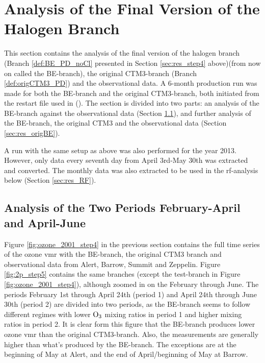 

\clearpage

\section{Analysis of the Final Version of the Halogen Branch}\label{sec:res_final_Version}

This section contains the analysis of the final version of the halogen branch (Branch \ref{def:BE_PD_noCl} presented in Section \ref{sec:res_step4} above)(from now on called the BE-branch), the original CTM3-branch (Branch \ref{def:origCTM3_PD}) and the observational data. A 6-month production run was made for both the BE-branch and the original CTM3-branch, both initiated from the restart file used in  (\cite{Falk_2019}). The section is divided into two parts: an analysis of the BE-branch against the observational data (Section \ref{sec:res_twoPeriods}), and further analysis of the BE-branch, the original CTM3 and the observational data (Section \ref{sec:res_origBE}).

\medskip

A run with the same setup as above was also performed for the year 2013. However, only data every seventh day from April 3rd-May 30th was extracted and converted. The monthly data was also extracted to be used in the \acrlong{rf}-analysis below (Section \ref{sec:res_RF}). 

\subsection{Analysis of the Two Periods February-April and April-June}\label{sec:res_twoPeriods}

Figure \ref{fig:ozone_2001_step4} in the previous section contains the full time series of the ozone \acrshort{vmr} with the BE-branch, the original CTM3 branch and observational data from Alert, Barrow, Summit and Zeppelin. Figure \ref{fig:2p_step5} contains the same branches (except the test-branch in Figure \ref{fig:ozone_2001_step4}), although zoomed in on the February through June. The periods February 1st through April 24th (period 1) and April 24th through June 30th (period 2) are divided into two periods, as the BE-branch seems to follow different regimes with lower $\mathrm{O_3}$ mixing ratios in period 1 and higher mixing ratios in period 2. It is clear form this figure that the BE-branch produces lower ozone \acrshort{vmr} than the original CTM3-branch. Also, the measurements are generally higher than what's produced by the BE-branch. The exceptions are at the beginning of May at Alert,  and the end of April/beginning of May at Barrow.

